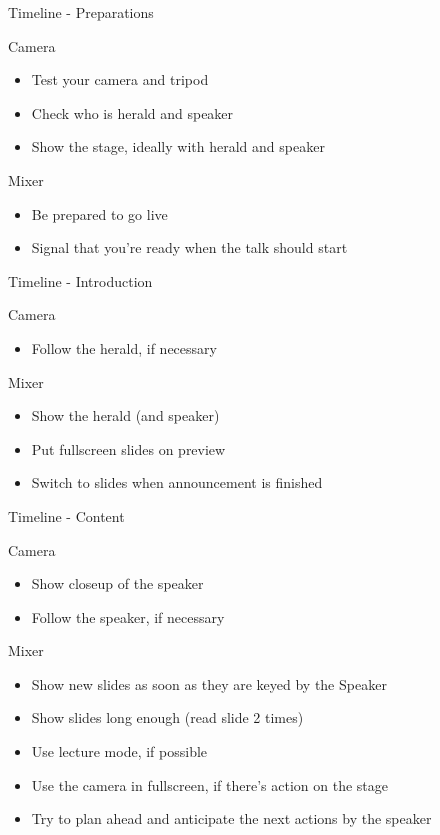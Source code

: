 
\begin{frame}{Timeline - Preparations}
	\begin{block}{Camera}
		\begin{itemize}
			\item Test your camera and tripod
			\item Check who is herald and speaker
			\item Show the stage, ideally with herald and speaker
		\end{itemize}
	\end{block}
	\begin{block}{Mixer}
		\begin{itemize}
			\item Be prepared to go live
			\item Signal that you're ready when the talk should start
		\end{itemize}
	\end{block}
\end{frame}

\begin{frame}{Timeline - Introduction}
	\begin{block}{Camera}
		\begin{itemize}
			\item Follow the herald, if necessary
		\end{itemize}
	\end{block}
	\begin{block}{Mixer}
		\begin{itemize}
			\item Show the herald (and speaker)
			\item Put fullscreen slides on preview
			\item Switch to slides when announcement is finished
		\end{itemize}
	\end{block}
\end{frame}

\begin{frame}{Timeline - Content}
	\begin{block}{Camera}
		\begin{itemize}
			\item Show closeup of the speaker
			\item Follow the speaker, if necessary
		\end{itemize}
	\end{block}
	\begin{block}{Mixer}
		\begin{itemize}
			\item Show new slides as soon as they are keyed by the Speaker 
			\item Show slides long enough (read slide 2 times)
			\item Use lecture mode, if possible
			\item Use the camera in fullscreen, if there's action on the stage
			\item Try to plan ahead and anticipate the next actions by the speaker
		\end{itemize}
	\end{block}
\end{frame}

